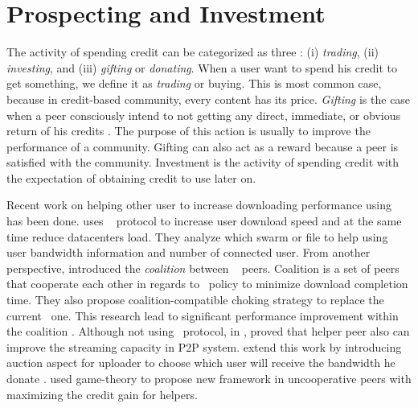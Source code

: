 \section{Prospecting and Investment}
The activity of spending credit can be categorized as three : (i) \textit{trading}, (ii) \textit{investing}, and (iii) \textit{gifting} or \textit{donating}. When a user want to spend his credit to get something, we define it as \textit{trading} or buying. This is most common case, because in credit-based community, every content has its price. \textit{Gifting} is the case when a peer consciously intend to not getting any direct, immediate, or obvious return of his credits \cite{2006:gifting:ripeanu}. The purpose of this action is usually to improve the performance of a community. Gifting can also act as a reward because a peer is satisfied with the community. Investment is the activity of spending credit with the expectation of obtaining credit to use later on. 

Recent work on helping other user to increase downloading performance using \bt~ has been done. \citeauthor{2014:cloudseed:leon} uses \bt~ protocol to increase user download speed and at the same time reduce datacenters load. They analyze which swarm or file to help using user bandwidth information and number of connected user\cite{2014:cloudseed:leon}. From another perspective, \citeauthor{2015:coalitionbt:zhang} introduced the \textit{coalition} between \bt~ peers. Coalition is a set of peers that cooperate each other in regards to \bt~policy to minimize download completion time. They also propose coalition-compatible choking strategy to replace the current \bt~one. This research lead to significant performance improvement within the coalition \cite{2015:coalitionbt:zhang}. Although not using \bt~protocol, in \citeyear{2009:p2phelp:he}, \citeauthor{2009:p2phelp:he} proved that helper peer also can improve the streaming capacity in P2P system\cite{2009:p2phelp:he}. \citeauthor{2016:gameauctionp2pstream:mostafavi} extend this work by introducing auction aspect for uploader to choose which user will receive the bandwidth he donate \cite{2016:gameauctionp2pstream:mostafavi}. \citeauthor{2016:gameauctionp2pstream:mostafavi} used game-theory to propose new framework in uncooperative peers with maximizing the credit gain for helpers.

